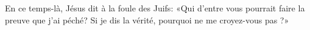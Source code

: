 En ce temps-là, Jésus dit à la foule des Juifs:
	«Qui d’entre vous pourrait faire la preuve que j’ai péché?
	Si je dis la vérité, pourquoi ne me croyez-vous pas ?»
